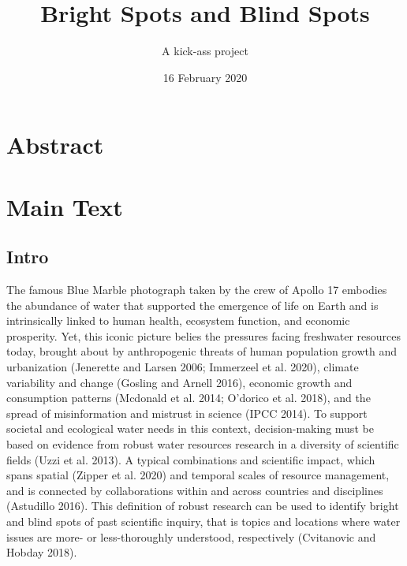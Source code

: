 \documentclass[]{article}
\title{Bright Spots and Blind Spots}
\subtitle{A kick-ass project}
\author{}
\date{16 February 2020}
\begin{document}
\maketitle

\hypertarget{abstract}{%
\section{Abstract}\label{abstract}}

\hypertarget{main-text}{%
\section{Main Text}\label{main-text}}

\hypertarget{intro}{%
\subsection{Intro}\label{intro}}

The famous Blue Marble photograph taken by the crew of Apollo 17
embodies the abundance of water that supported the emergence of life on
Earth and is intrinsically linked to human health, ecosystem function,
and economic prosperity. Yet, this iconic picture belies the pressures
facing freshwater resources today, brought about by anthropogenic
threats of human population growth and urbanization (Jenerette and
Larsen 2006; Immerzeel et al. 2020), climate variability and change
(Gosling and Arnell 2016), economic growth and consumption patterns
(Mcdonald et al. 2014; O'dorico et al. 2018), and the spread of
misinformation and mistrust in science (IPCC 2014). To support societal
and ecological water needs in this context, decision-making must be
based on evidence from robust water resources research in a diversity of
scientific fields (Uzzi et al. 2013). A typical combinations and
scientific impact, which spans spatial (Zipper et al. 2020) and temporal
scales of resource management, and is connected by collaborations within
and across countries and disciplines (Astudillo 2016). This definition
of robust research can be used to identify bright and blind spots of
past scientific inquiry, that is topics and locations where water issues
are more- or less-thoroughly understood, respectively (Cvitanovic and
Hobday 2018).
\end{document}
